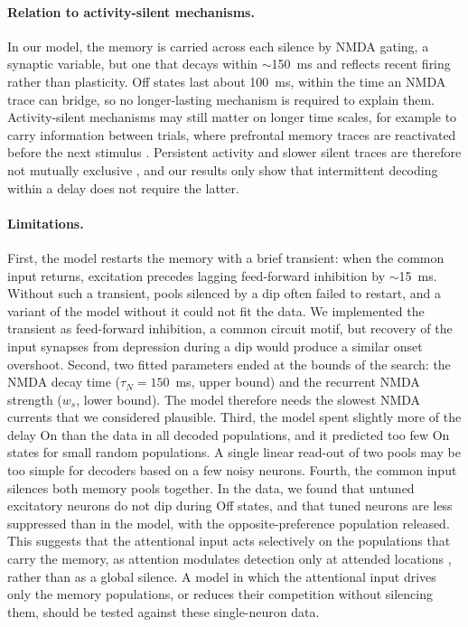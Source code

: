 \paragraph{Relation to activity-silent mechanisms.}
In our model, the memory is carried across each silence by NMDA gating, a synaptic variable, but one that decays within $\sim$150~ms and reflects recent firing rather than plasticity.
Off states last about 100~ms, within the time an NMDA trace can bridge, so no longer-lasting mechanism is required to explain them.
Activity-silent mechanisms may still matter on longer time scales, for example to carry information between trials, where prefrontal memory traces are reactivated before the next stimulus \citep{barbosa2020}.
Persistent activity and slower silent traces are therefore not mutually exclusive \citep{barbosa2020}, and our results only show that intermittent decoding within a delay does not require the latter.

\paragraph{Limitations.}
First, the model restarts the memory with a brief transient: when the common input returns, excitation precedes lagging feed-forward inhibition by $\sim$15~ms.
Without such a transient, pools silenced by a dip often failed to restart, and a variant of the model without it could not fit the data.
We implemented the transient as feed-forward inhibition, a common circuit motif, but recovery of the input synapses from depression during a dip would produce a similar onset overshoot.
Second, two fitted parameters ended at the bounds of the search: the NMDA decay time ($\tau_N = 150$~ms, upper bound) and the recurrent NMDA strength ($w_s$, lower bound).
The model therefore needs the slowest NMDA currents that we considered plausible.
Third, the model spent slightly more of the delay On than the data in all decoded populations, and it predicted too few On states for small random populations.
A single linear read-out of two pools may be too simple for decoders based on a few noisy neurons.
Fourth, the common input silences both memory pools together.
In the data, we found that untuned excitatory neurons do not dip during Off states, and that tuned neurons are less suppressed than in the model, with the opposite-preference population released.
This suggests that the attentional input acts selectively on the populations that carry the memory, as attention modulates detection only at attended locations \citep{busch2010}, rather than as a global silence.
A model in which the attentional input drives only the memory populations, or reduces their competition without silencing them, should be tested against these single-neuron data.

